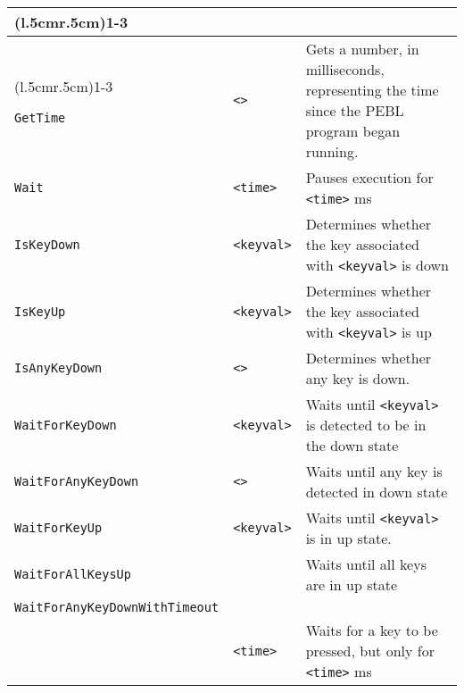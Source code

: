 \begin{longtable}{p{3cm}p{3cm}p{6cm}}
\addlinespace[0.2cm] 

\cmidrule(l{.5cm}r{.5cm}){1-3} 
\multicolumn{3}{c}{\textbf{Misc Event Functions}}\\ 
\cmidrule(l{.5cm}r{.5cm}){1-3} 


\verb+GetTime+ &\verb+<>+ &Gets a number, in milliseconds, representing the time since the PEBL program began running.\\ 
\verb+Wait+ &\verb+<time>+ &Pauses execution for \verb+<time>+ ms \\ 
\verb+IsKeyDown+ &\verb+<keyval>+ &Determines whether the key associated with \verb+<keyval>+ is down \\ 
\verb+IsKeyUp+ &\verb+<keyval>+ &Determines whether the key associated with \verb+<keyval>+ is up\\ 
\verb+IsAnyKeyDown+ &\verb+<>+ &Determines whether any key is down.\\ 
\verb+WaitForKeyDown+ & \verb+<keyval>+ &Waits until \verb+<keyval>+ is detected to be in the down state\\ 
\verb+WaitForAnyKeyDown+ &\hspace{0.5cm} \verb+<>+ &Waits until any key is detected in down state\\ 
\verb+WaitForKeyUp+ &\verb+<keyval>+ &Waits until \verb+<keyval>+ is in up state.\\ 
\verb+WaitForAllKeysUp+ & &Waits until all keys are in up state\\ 
\verb+WaitForAnyKeyDownWithTimeout+ & & \\ 
& \verb+<time>+ & Waits for a key to be pressed, but only for \verb+<time>+ ms\\ 


\end{longtable}

